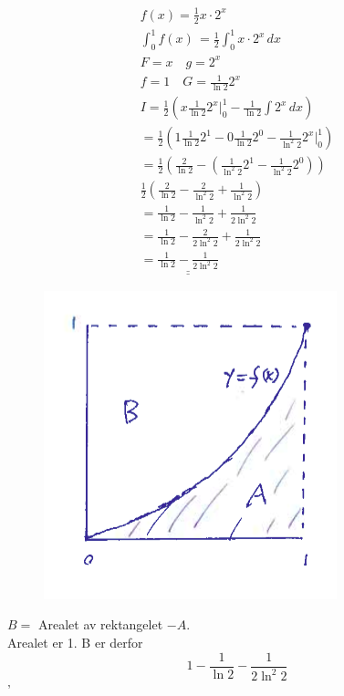 \documentclass[defaultpackages]{cheatsheet}
\def\doubleunderline#1{\underline{\underline{#1}}}
\begin{document}
	\subsection{}
	\begin{gather*}
		f(x) = \frac{1}{2}x\cdot 2^x\\
		\int_0^1 f(x)\, = \frac{1}{2} \int_0^1  x\cdot 2^x\,dx\\
		F = x \quad g = 2^x\\
		f = 1 \quad G = \frac{1}{\ln 2}2^x\\
		I = \frac{1}{2}\left( x\frac{1}{\ln 2}2^x\Big\rvert_0^1 - \frac{1}{\ln 2}\int 2^x \,dx\right)\\
		= \frac{1}{2}\left(1 \frac{1}{\ln 2}2^1 - 0 \frac{1}{\ln 2}2^0 - \frac{1}{\ln^2 2}2^x \bigg\rvert_0^1\right)\\
		= \frac{1}{2}\left(\frac{2}{\ln 2}-\left(\frac{1}{\ln^2 2}2^1 - \frac{1}{\ln^2 2}2^0\right)\right)\\
		\frac{1}{2}\left(\frac{2}{\ln 2}-\frac{2}{\ln^2 2} + \frac{1}{\ln^2 2}\right)\\
		= \frac{1}{\ln 2} - \frac{1}{\ln^2 2} + \frac{1}{2\ln^2 2 }\\
		=  \frac{1}{\ln 2} - \frac{2}{2\ln^2 2} + \frac{1}{2\ln^2 2 }\\
		= \doubleunderline{\frac{1}{\ln 2} - \frac{1}{2\ln^2 2}}
	\end{gather*}
	\begin{figure}[H]
		\includegraphics[width=\columnwidth]{idk.png}
	\end{figure}
	$B = $ Arealet av rektangelet $ - A$.
	\\
	Arealet er 1.
	B er derfor 
	\[1 - \frac{1}{\ln 2} - \frac{1}{2\ln^2 2}\]'
\end{document}
